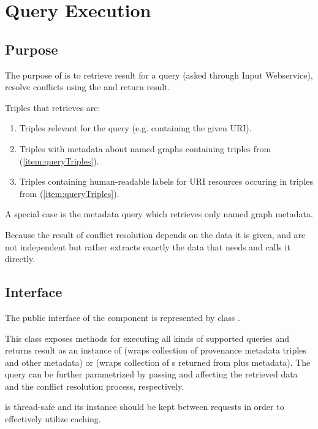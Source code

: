 \chapter{Query Execution}
\label{sec:QE}

\section{Purpose}
The purpose of \QE is to retrieve result for a query (asked through Input Webservice), resolve conflicts using the \CR and return result.

Triples that \QE retrieves are:
\begin{enumerate}
	\item \label{item:queryTriples} Triples relevant for the query (e.g. containing the given URI).
	\item Triples with metadata about named graphs containing triples from (\ref{item:queryTriples}).
	\item Triples containing human-readable labels for URI resources occuring in triples from (\ref{item:queryTriples}).
\end{enumerate}
A special case is the metadata query which retrieves only named graph metadata.

Because the result of conflict resolution depends on the data it is given, \QE and \CR are not independent but rather \QE extracts exactly the data that \CR needs and calls it directly.

\section{Interface}
The public interface of the \QE component is represented by class .

 This class exposes methods for executing all kinds of supported queries and returns result as an instance of  (wraps collection of provenance metadata triples and other metadata) or  (wraps collection of s returned from \CR plus metadata). The query can be further parametrized by passing  and  affecting the retrieved data and the conflict resolution process, respectively.

  is thread-safe and its instance should be kept between requests in order to effectively utilize caching.

